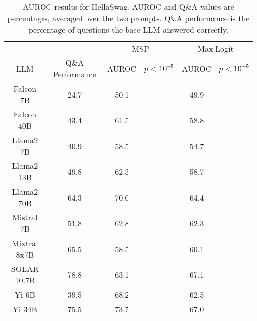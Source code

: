 \begin{table*}
\centering
\begin{tabular}{c|c|c|c|c|c}
& & \multicolumn{2}{c|}{MSP} & \multicolumn{2}{c}{Max Logit} \\ 
LLM & Q\&A Performance & AUROC & $p < 10^{-5}$ & AUROC & $p < 10^{-5}$\\ \hline
Falcon 7B & 24.7 & 50.1 &  & 49.9 & \\
Falcon 40B & 43.4 & 61.5 &  & 58.8 & \\
Llama2 7B & 40.9 & 58.5 &  & 54.7 & \\
Llama2 13B & 49.8 & 62.3 &  & 58.7 & \\
Llama2 70B & 64.3 & 70.0 &  & 64.4 & \\
Mistral 7B & 51.8 & 62.8 &  & 62.3 & \\
Mixtral 8x7B & 65.5 & 58.5 &  & 60.1 & \\
SOLAR 10.7B & 78.8 & 63.1 &  & 67.1 & \\
Yi 6B & 39.5 & 68.2 &  & 62.5 & \\
Yi 34B & 75.5 & 73.7 &  & 67.0 & \\
\hline
\end{tabular}
\caption{AUROC results for HellaSwag. AUROC and Q\&A values are percentages, averaged over the two prompts. Q\&A performance is the percentage of questions the base LLM answered correctly.}
\label{tab:hellaswag_auroc}
\end{table*}
